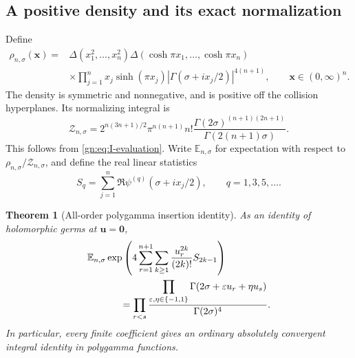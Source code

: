 \documentclass[11pt,a4paper]{article}
\numberwithin{equation}{section}
\newtheorem{theorem}{Theorem}[section]
\theoremstyle{definition}
\theoremstyle{remark}
\begin{document}
\subsection{A positive density and its exact normalization}

Define
\begin{equation}\label{gn:eq:density}
\begin{split}
 \rho_{n,\sigma}(\mathbf x)
 ={}&\Delta(x_1^2,\ldots,x_n^2)
      \Delta(\cosh\pi x_1,\ldots,\cosh\pi x_n)\\
 &\times\prod_{j=1}^n x_j\sinh(\pi x_j)
              |\Gamma(\sigma+ix_j/2)|^{4(n+1)},
 \qquad \mathbf x\in(0,\infty)^n.
\end{split}
\end{equation}
The density is symmetric and nonnegative, and is positive off the
collision hyperplanes.  Its normalizing integral is
\begin{equation}\label{gn:eq:Z}
 \mathcal Z_{n,\sigma}
 =2^{n(3n+1)/2}\pi^{n(n+1)}n!
       \frac{\Gamma(2\sigma)^{(n+1)(2n+1)}}
            {\Gamma(2(n+1)\sigma)}.
\end{equation}
This follows from \eqref{gn:eq:I-evaluation}.  Write $\mathbb E_{n,\sigma}$
for expectation with respect to $\rho_{n,\sigma}/\mathcal Z_{n,\sigma}$,
and define the real linear statistics
\begin{equation}\label{gn:eq:statistics}
 S_q=\sum_{j=1}^n\Re\psi^{(q)}(\sigma+ix_j/2),
                   \qquad q=1,3,5,\ldots.
\end{equation}

\begin{theorem}[All-order polygamma insertion identity]
\label{gn:thm:polygamma-germ}
As an identity of holomorphic germs at $\mathbf u=\mathbf0$,
\begin{equation}\label{gn:eq:polygamma-germ}
\begin{split}
 &\mathbb E_{n,\sigma}
  \exp\left(4\sum_{r=1}^{n+1}\sum_{k\ge1}
                   \frac{u_r^{2k}}{(2k)!}S_{2k-1}\right)\\
 &\hspace{12mm}=
 \prod_{r<s}
   \frac{\displaystyle\prod_{\varepsilon,\eta\in\{-1,1\}}
         \Gamma(2\sigma+\varepsilon u_r+\eta u_s)}
        {\Gamma(2\sigma)^4}.
\end{split}
\end{equation}
In particular, every finite coefficient gives an ordinary absolutely
convergent integral identity in polygamma functions.
\end{theorem}
\end{document}
